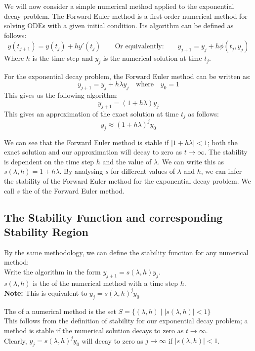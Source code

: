\par We will now consider a simple numerical method applied to the exponential decay problem.
The Forward Euler method is a first-order numerical method for solving ODEs with a given initial condition.
Its algorithm can be defined as follows:
\[ y(t_{j+1}) = y(t_j) + h y'(t_j) \qquad \text{Or equivalently:} \qquad y_{j+1} = y_j + h \phi(t_j, y_j)\]
Where $h$ is the time step and $y_j$ is the numerical solution at time $t_j$.

\par For the exponential decay problem, the Forward Euler method can be written as:
\[ y_{j+1} = y_j + h \lambda y_j \quad \text{where} \quad y_0 = 1\]
This gives us the following algorithm:
\[ y_{j+1} = (1 + h \lambda) y_j\]
This gives an approximation of the exact solution at time $t_j$ as follows:
\[ y_{j} \approx {(1 + h \lambda)}^j y_0\]

\par We can see that the Forward Euler method is stable if $|1 + h \lambda| < 1$; both the exact solution and our approximation will decay to zero as $t \rightarrow \infty$.
The stability is dependent on the time step $h$ and the value of $\lambda$.
We can write this as $s(\lambda, h) = 1 + h \lambda$.
By analysing $s$ for different values of $\lambda$ and $h$, we can infer the stability of the Forward Euler method for the exponential decay problem.
We call $s$ the  of the Forward Euler method.



\subsection{The Stability Function and corresponding Stability Region}
\par By the same methodology, we can define the stability function for any numerical method:\\
Write the algorithm in the form $y_{j+1} = s(\lambda, h) y_{j}$.\\
$s(\lambda, h)$ is the  of the numerical method with a time step $h$.\\
\textbf{Note:} This is equivalent to $y_{j} = {s(\lambda,h)}^{j} y_0$

\par The  of a numerical method is the set $S = \Big\{ (\lambda, h) \;\Big|\; |s(\lambda, h)| < 1\Big\}$\\
This follows from the definition of stability for our exponential decay problem; a method is stable if the numerical solution decays to zero as $t \rightarrow \infty$.\\
Clearly, $y_{j} = {s(\lambda,h)}^{j} y_0$ will decay to zero as $j \rightarrow \infty$ if $|s(\lambda, h)| < 1$.

